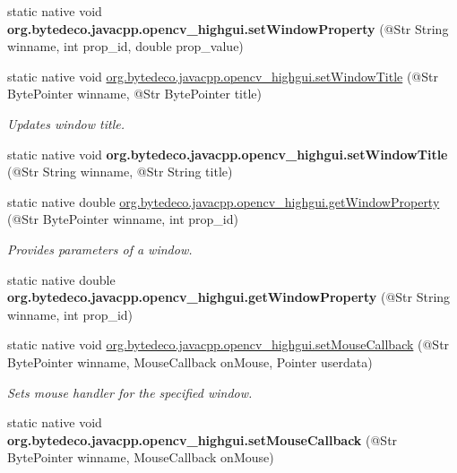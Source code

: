 \begin{DoxyCompactItemize}
static native void {\bfseries org.\+bytedeco.\+javacpp.\+opencv\+\_\+highgui.\+set\+Window\+Property} (@Str String winname, int prop\+\_\+id, double prop\+\_\+value)
\item 
static native void \hyperlink{group__highgui_gaf4453988c16611eed72c58d647d6e31d}{org.\+bytedeco.\+javacpp.\+opencv\+\_\+highgui.\+set\+Window\+Title} (@Str Byte\+Pointer winname, @Str Byte\+Pointer title)
\begin{DoxyCompactList}\small\item\em Updates window title. \end{DoxyCompactList}\item 
\mbox{\label{group__highgui_ga669c6553b904bed20d14fdb6d3539ad6}} 
static native void {\bfseries org.\+bytedeco.\+javacpp.\+opencv\+\_\+highgui.\+set\+Window\+Title} (@Str String winname, @Str String title)
\item 
static native double \hyperlink{group__highgui_gabedecb2109425cb553d605080ad980a9}{org.\+bytedeco.\+javacpp.\+opencv\+\_\+highgui.\+get\+Window\+Property} (@Str Byte\+Pointer winname, int prop\+\_\+id)
\begin{DoxyCompactList}\small\item\em Provides parameters of a window. \end{DoxyCompactList}\item 
\mbox{\label{group__highgui_ga3d5796e2f9c9284e62e35a2333e04203}} 
static native double {\bfseries org.\+bytedeco.\+javacpp.\+opencv\+\_\+highgui.\+get\+Window\+Property} (@Str String winname, int prop\+\_\+id)
\item 
static native void \hyperlink{group__highgui_gae53ffbc47967af79b35268d57575d6b4}{org.\+bytedeco.\+javacpp.\+opencv\+\_\+highgui.\+set\+Mouse\+Callback} (@Str Byte\+Pointer winname, Mouse\+Callback on\+Mouse, Pointer userdata)
\begin{DoxyCompactList}\small\item\em Sets mouse handler for the specified window. \end{DoxyCompactList}\item 
\mbox{\label{group__highgui_gae9abe00b2e4bff3bca4549040695e9d0}} 
static native void {\bfseries org.\+bytedeco.\+javacpp.\+opencv\+\_\+highgui.\+set\+Mouse\+Callback} (@Str Byte\+Pointer winname, Mouse\+Callback on\+Mouse)
\item 
\mbox{\label{group__highgui_gad3fe1d57b8a0596f8a767033e113c2f4}} 

\end{DoxyCompactItemize}

